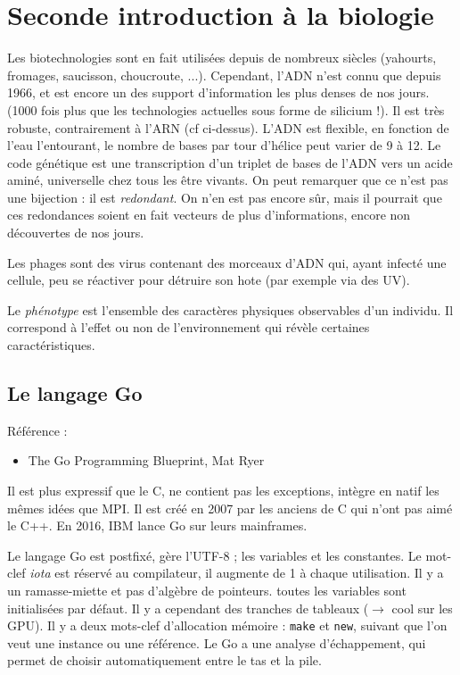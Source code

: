 \documentclass{article}
\begin{document}
\section{Seconde introduction à la biologie}
Les biotechnologies sont en fait utilisées depuis de nombreux siècles (yahourts, fromages, saucisson, choucroute, ...). Cependant, l'ADN n'est connu que depuis 1966, et est encore un des support d'information les plus denses de nos jours. (1000 fois plus que les technologies actuelles sous forme de silicium !). Il est très robuste, contrairement à l'ARN (cf ci-dessus). L'ADN est flexible, en fonction de l'eau l'entourant, le nombre de bases par tour d'hélice peut varier de 9 à 12. Le code génétique est une transcription d'un triplet de bases de l'ADN vers un acide aminé, universelle chez tous les être vivants. On peut remarquer que ce n'est pas une bijection : il est \emph{redondant}. On n'en est pas encore sûr, mais il pourrait que ces redondances soient en fait vecteurs de plus d'informations, encore non découvertes de nos jours.


Les phages sont des virus contenant des morceaux d'ADN qui, ayant infecté une cellule, peu se réactiver pour détruire son hote (par exemple via des UV).


Le \emph{phénotype} est l'ensemble des caractères physiques observables d'un individu. Il correspond à l'effet ou non de l'environnement qui révèle certaines caractéristiques.

\subsection*{Le langage Go}
Référence :
\begin{itemize}
\item The Go Programming Blueprint, Mat Ryer
\end{itemize}


Il est plus expressif que le C, ne contient pas les exceptions, intègre en natif les mêmes idées que MPI. Il est créé en 2007 par les anciens de C qui n'ont pas aimé le C++. En 2016, IBM lance Go sur leurs mainframes.


Le langage Go est postfixé, gère l'UTF-8 ; les variables et les constantes. Le mot-clef \emph{iota} est réservé au compilateur, il augmente de 1 à chaque utilisation. Il y a un ramasse-miette et pas d'algèbre de pointeurs. toutes les variables sont initialisées par défaut. Il y a cependant des tranches de tableaux ($\to$ cool sur les GPU). Il y a deux mots-clef d'allocation mémoire : \texttt{make} et \texttt{new}, suivant que l'on veut une instance ou une référence. Le Go a une analyse d'échappement, qui permet de choisir automatiquement entre le tas et la pile.
\end{document}
